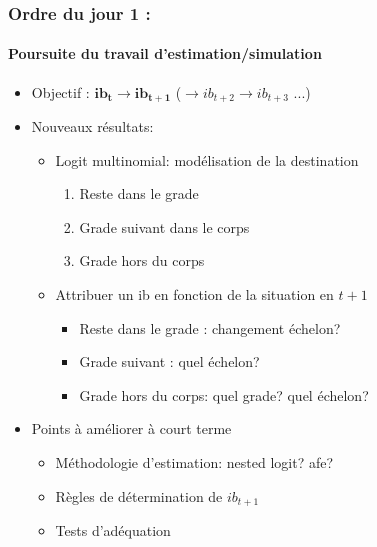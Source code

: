 \documentclass[xcolor=table,ignorenonframetext,12pt]{beamer}
\newenvironment{choixmarges}[2]{\begin{list}{}{%
\setlength{\topsep}{0pt}%
\setlength{\leftmargin}{0pt}%
\setlength{\rightmargin}{0pt}%
\setlength{\listparindent}{\parindent}%
\setlength{\itemindent}{\parindent}%
\setlength{\parsep}{0pt plus 1pt}%
\addtolength{\leftmargin}{#1}%
\addtolength{\rightmargin}{#2}%
}\item }{\end{list}}
\begin{document}
\begin{frame}
\frametitle{Ordre du jour 1 : }
\framesubtitle{Poursuite du travail d'estimation/simulation}

\begin{choixmarges}{-0.5cm}{-0.5cm}
\begin{itemize}
\item Objectif : $\mathbf{ib_t \rightarrow ib_{t+1}}$ ($\rightarrow ib_{t+2} \rightarrow ib_{t+3}$ ...)

\vspace{0.2cm}
\item Nouveaux résultats:
\begin{itemize}
\item Logit multinomial: modélisation de la destination 
\begin{enumerate}
\item Reste dans le grade
\item Grade suivant dans le corps
\item Grade hors du corps
\end{enumerate}
\item Attribuer un ib en fonction de la situation en $t+1$ 
\begin{itemize}
\item Reste dans le grade : changement échelon?
\item Grade suivant : quel échelon?
\item Grade hors du corps: quel grade? quel échelon?
\end{itemize}
\end{itemize}

\vspace{0.2cm}
\item Points à améliorer à court terme
\begin{itemize}
\item Méthodologie d'estimation: nested logit? afe?
\item Règles de détermination de $ib_{t+1}$
\item Tests d'adéquation
\end{itemize}

\end{itemize}

\end{choixmarges}
\end{frame}
\end{document}
